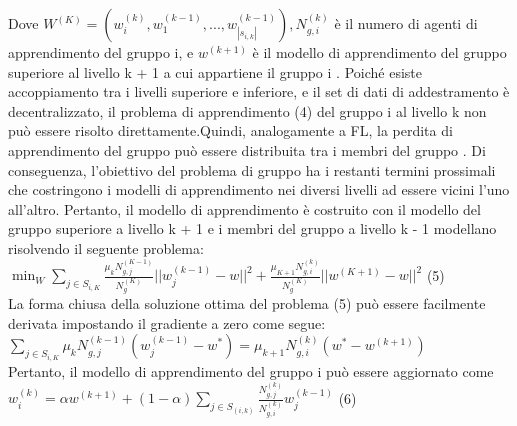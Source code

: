 Dove $W^{(K)} = (w_i^{(k)},w_1^{(k-1)},...,w_{|s_{i,k}|}^{(k-1)}),N_{g,i}^{(k)}$ è il numero di agenti di apprendimento del gruppo i, e $w^{(k+1)}$ è il modello di apprendimento del gruppo superiore al livello k + 1 a cui appartiene il gruppo i . Poiché esiste accoppiamento tra i livelli superiore e inferiore, e il set di dati di addestramento è decentralizzato, il problema di apprendimento (4) del gruppo i al livello k non può essere risolto direttamente.Quindi, analogamente a FL, la perdita di apprendimento del gruppo può essere distribuita tra i membri del gruppo . Di conseguenza, l'obiettivo del problema di gruppo ha i restanti termini prossimali che costringono i modelli di apprendimento nei diversi livelli ad essere vicini l'uno all'altro. Pertanto, il modello di apprendimento è costruito con il modello del gruppo superiore a livello k + 1 e i membri del gruppo a livello k - 1 modellano risolvendo il seguente problema:\vspace{0.5cm}\\

$\min_{W}\sum_{j\in S_{i,K}} \frac{\mu_kN_{g,j}^{(K-1)}}{N_g^{(K)}}||w_j^{(k-1)}-w||^2+\frac{\mu_{K+1}N_{g,i}^{(k)}}{N_g^{(K)}}||w^{(K+1)}-w||^2$ \hfill(5)\vspace{0.5cm}\\

La forma chiusa della soluzione ottima del problema (5) può essere facilmente derivata impostando il gradiente a zero come segue:\vspace{0.5cm}\\

$\sum_{j\in S_{i,K}}\mu_kN_{g,j}^{(k-1)}(w_j^{(k-1)}-w^*)=\mu_{k+1}N_{g,i}^{(k)}(w^*-w^{(k+1)})$\vspace{0.5cm}\\

Pertanto, il modello di apprendimento del gruppo i può essere aggiornato come\vspace{0.5cm}\\

$w_i^{(k)}=\alpha w^{(k+1)}+(1-\alpha)\sum_{j\in S_{(i,k)}}\frac{N_{g,j}^{(k)}}{N_{g,i}^{(k)}}w_j^{(k-1)}$ \hfill(6)\vspace{0.5cm}\\

